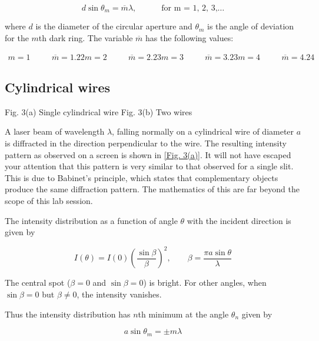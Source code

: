 \begin{equation*}
    d \sin{\theta_m} = \overline{m} \lambda,  \quad\quad\quad \text{for    m  = 1, 2, 3,}\hdots
\end{equation*}

where $d$ is the diameter of the circular aperture and $\theta_m$ is the angle of deviation for the $m$th dark ring. The variable $\overline{m}$ has the following values:

\begin{equation*}
    \begin{aligned}
        m = 1 &\quad& \overline{m}=1.22
        m = 2 &\quad& \overline{m}=2.23
        m = 3 &\quad& \overline{m}=3.23
        m = 4 &\quad& \overline{m}=4.24
    \end{aligned}
\end{equation*}

\subsection*{Cylindrical wires}

 
 Fig. 3(a) Single cylindrical wire                                Fig. 3(b) Two wires

A laser beam of wavelength $\lambda$, falling normally on a cylindrical wire of diameter $a$ is diffracted in the direction perpendicular to the wire. The resulting intensity pattern as observed on a screen is shown in \ref{Fig. 3(a)}. It will not have escaped your attention that this pattern is very similar to that observed for a single slit. This is due to Babinet’s principle, which states that complementary objects produce the same diffraction pattern. The mathematics of this are far beyond the scope of this lab session.

The intensity distribution as a function of angle $\theta$ with the incident direction is given by

\begin{equation*}
    I(\theta) = I(0) \left( \frac{\sin \beta}{\beta} \right)^2, \quad \quad  \beta = \frac{\pi a \sin \theta}{\lambda}
\end{equation*}


The central spot ($\beta = 0$ and $\sin\beta = 0$) is bright. For other angles, when $\sin\beta=0$ but $\beta \neq 0$, the intensity vanishes.

Thus the intensity distribution has $n$th minimum at the angle $\theta_n$ given by

\begin{equation*}
    a \sin\theta_m = \pm m \lambda
\end{equation*}

